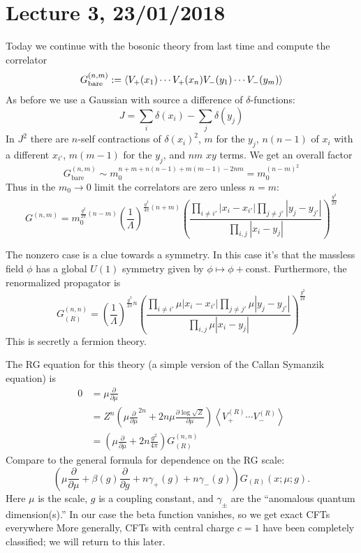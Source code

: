 \section*{Lecture 3, 23/01/2018}
Today we continue with the bosonic theory from last time and compute the correlator
\[
G^{(n,m)}_{\text{bare}} := \left \langle V_+(x_1) \cdots V_+(x_n) V_-(y_1)\cdots V_-(y_m) \right \rangle
\]
As before we use a Gaussian with source a difference of $\delta$-functions:
\[
J = \sum_i \delta(x_i) - \sum_j \delta(y_j)
\]
In $J^2$ there are $n$-self contractions of $\delta(x_i)^2$, $m$ for the $y_j$, $n(n-1)$ of $x_i$ with a different $x_{i'}$, $m(m-1)$ for the $y_j$, and $nm$ $xy$ terms.
We get an overall factor
\[
G_{\text{bare}}^{(n,m)} \sim m_0^{n+m+n(n-1) + m(m-1) - 2nm} = m_0^{(n-m)^2}
\]
Thus in the $m_0 \to 0$ limit the correlators are zero unless $n=m$:
\[
G^{(n,m)} = m_0^{\frac{g^2}{2 \pi} (n-m)} \left( \frac{1}{\Lambda}\right)^{\frac{g^2}{4\pi} (n+m)} \left( \frac{\prod_{i\ne i'} |x_i - x_{i'}| \prod_{j \ne j'} |y_j - y_{j'}|}{\prod_{i,j} |x_i - y_j|}\right)^{\frac{g^2}{2\pi}}
\]

The nonzero case is a clue towards a symmetry.
In this case it's that the massless field $\phi$ has a global $U(1)$ symmetry given by $\phi \mapsto \phi + \text{const}$.
Furthermore, the renormalized propagator is
\[
G^{(n,n)}_{(R)} = \left( \frac{1}{\Lambda}\right)^{\frac{g^2}{2\pi} n} \left( \frac{\prod_{i\ne i'} \mu |x_i - x_{i'}|  \prod_{j \ne j'} \mu |y_j - y_{j'}|}{\prod_{i,j} \mu|x_i - y_j|}\right)^{\frac{g^2}{2\pi}}
\]
This is secretly a fermion theory.

The RG equation for this theory (a simple version of the Callan Symanzik equation) is
\begin{align*}
0 &= \mu \frac{\partial}{\partial \mu} \\
&= Z^n \left( \mu \frac{\partial}{\partial \mu}^{2n} + 2n \mu \frac{\partial \log \sqrt Z}{\partial \mu} \right) \left \langle V_+^{(R)} \cdots V_-^{(R)} \right \rangle\\
&= \left( \mu \frac{\partial}{\partial\mu} + 2n \frac{g^2}{4\pi}\right) G^{(n,n)}_{(R)}
\end{align*}
Compare to the general formula for dependence on the RG scale:
\[
\left( \mu \frac{\partial}{\partial \mu} + \beta(g) \frac{\partial}{\partial g} + n \gamma_+(g) + n \gamma_-(g) \right) G_{(R)}(x;\mu;g).
\]
Here $\mu$ is the scale, $g$ is a coupling constant, and $\gamma_\pm$ are the ``anomalous quantum dimension(s).''
In our case the beta function vanishes, so we get exact CFTs everywhere 
More generally, CFTs with central charge $c = 1$ have been completely classified; we will return to this later.

